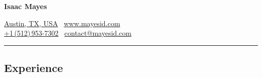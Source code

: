 \documentclass[9pt,letterpaper]{extarticle}
\begin{document}
\sffamily

\begin{center}
{\Huge \textbf{Isaac Mayes}}

\href{https://www.google.com/maps/place/Austin,+TX+78701/}{Austin, TX, USA} \textbullet\ \href{http://www.mayesid.com}{www.mayesid.com}
\\
\href{tel:+15129537302}{+1\,(512)\,953-7302} \textbullet\ \href{mailto:contact@mayesid.com}{contact@mayesid.com}
\end{center}

\hrule
\vspace{-0.5em}
\subsection*{Experience}
\end{document}
